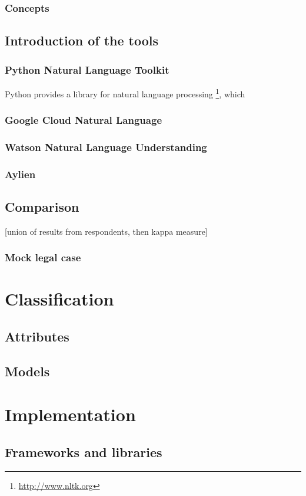 \documentclass[
  digital, %
  table,   %
  lof,     %
  lot,     %
]{fithesis3}
\begin{document}
\subsection{Concepts}

\section{Introduction of the tools}

\subsection{Python Natural Language Toolkit}
Python provides a library for natural language processing \footnote{\url{http://www.nltk.org}}, which 
\subsection{Google Cloud Natural Language}
\subsection{Watson Natural Language Understanding}
\subsection{Aylien}

\section{Comparison}
[union of results from respondents, then kappa measure]
\subsection{Mock legal case}
\chapter{Classification}
\section{Attributes}
\section{Models}

\chapter{Implementation}
\section{Frameworks and libraries}
\end{document}
